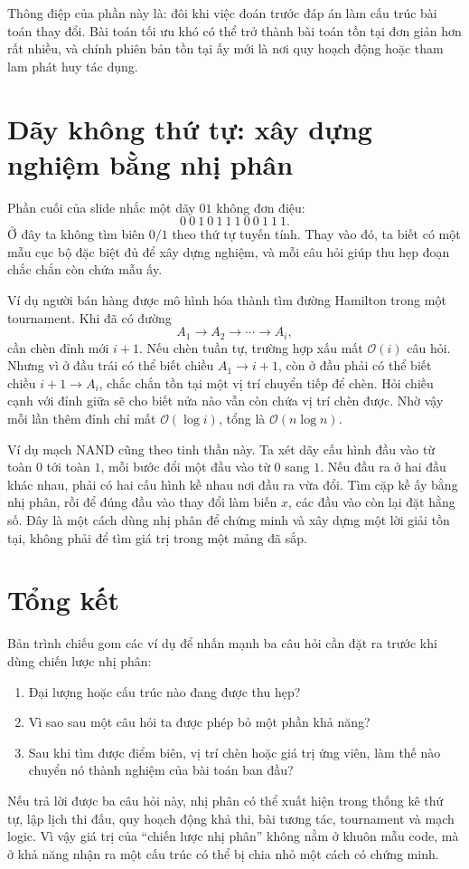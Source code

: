 \documentclass[11pt]{article}
\newcommand{\Oh}{\mathcal{O}}
\begin{document}
Thông điệp của phần này là: đôi khi việc đoán trước đáp án làm cấu trúc bài
toán thay đổi. Bài toán tối ưu khó có thể trở thành bài toán tồn tại đơn
giản hơn rất nhiều, và chính phiên bản tồn tại ấy mới là nơi quy hoạch động
hoặc tham lam phát huy tác dụng.

\section{Dãy không thứ tự: xây dựng nghiệm bằng nhị phân}

Phần cuối của slide nhắc một dãy \(01\) không đơn điệu:
\[
  0\ 0\ 1\ 0\ 1\ 1\ 1\ 0\ 0\ 1\ 1\ 1.
\]
Ở đây ta không tìm biên \(0/1\) theo thứ tự tuyến tính. Thay vào đó, ta biết
có một mẫu cục bộ đặc biệt đủ để xây dựng nghiệm, và mỗi câu hỏi giúp thu
hẹp đoạn chắc chắn còn chứa mẫu ấy.

Ví dụ người bán hàng được mô hình hóa thành tìm đường Hamilton trong một
tournament. Khi đã có đường
\[
  A_1\to A_2\to\cdots\to A_i,
\]
cần chèn đỉnh mới \(i+1\). Nếu chèn tuần tự, trường hợp xấu mất \(\Oh(i)\)
câu hỏi. Nhưng vì ở đầu trái có thể biết chiều \(A_1\to i+1\), còn ở đầu
phải có thể biết chiều \(i+1\to A_i\), chắc chắn tồn tại một vị trí chuyển
tiếp để chèn. Hỏi chiều cạnh với đỉnh giữa sẽ cho biết nửa nào vẫn còn chứa
vị trí chèn được. Nhờ vậy mỗi lần thêm đỉnh chỉ mất \(\Oh(\log i)\), tổng là
\(\Oh(n\log n)\).

Ví dụ mạch NAND cũng theo tinh thần này. Ta xét dãy cấu hình đầu vào từ toàn
\(0\) tới toàn \(1\), mỗi bước đổi một đầu vào từ \(0\) sang \(1\). Nếu đầu
ra ở hai đầu khác nhau, phải có hai cấu hình kề nhau nơi đầu ra vừa đổi. Tìm
cặp kề ấy bằng nhị phân, rồi để đúng đầu vào thay đổi làm biến \(x\), các đầu
vào còn lại đặt hằng số. Đây là một cách dùng nhị phân để chứng minh và xây
dựng một lời giải tồn tại, không phải để tìm giá trị trong một mảng đã sắp.

\section{Tổng kết}

Bản trình chiếu gom các ví dụ để nhấn mạnh ba câu hỏi cần đặt ra trước khi
dùng chiến lược nhị phân:
\begin{enumerate}
  \item Đại lượng hoặc cấu trúc nào đang được thu hẹp?
  \item Vì sao sau một câu hỏi ta được phép bỏ một phần khả năng?
  \item Sau khi tìm được điểm biên, vị trí chèn hoặc giá trị ứng viên, làm
  thế nào chuyển nó thành nghiệm của bài toán ban đầu?
\end{enumerate}

Nếu trả lời được ba câu hỏi này, nhị phân có thể xuất hiện trong thống kê thứ
tự, lập lịch thi đấu, quy hoạch động khả thi, bài tương tác, tournament và
mạch logic. Vì vậy giá trị của ``chiến lược nhị phân'' không nằm ở khuôn mẫu
code, mà ở khả năng nhận ra một cấu trúc có thể bị chia nhỏ một cách có chứng
minh.
\end{document}
